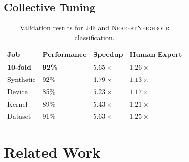 \documentclass[nonatbib,preprint,9pt]{sigplanconf}
\begin{document}
\subsection{Collective Tuning}

\begin{table}
\scriptsize
\centering
\begin{tabular}{llll}
\toprule
              Job &    Performance &            Speedup &       Human Expert \\
\midrule
\textbf{10-fold} & \textbf{92\%} & \textbf{$5.65\times$} & \textbf{$1.26\times$} \\
        Synthetic &           92\% &       $4.79\times$ &       $1.13\times$ \\
           Device &           85\% &       $5.23\times$ &       $1.17\times$ \\
           Kernel &           89\% &       $5.43\times$ &       $1.21\times$ \\
          Dataset &           91\% &       $5.63\times$ &       $1.25\times$ \\
\bottomrule
\end{tabular}
\caption{Validation results for J48 and \textsc{NearestNeighbour}
  classification.}
\label{tab:class}
\end{table}


\section{Related Work}\label{sec:related}



\end{document}
